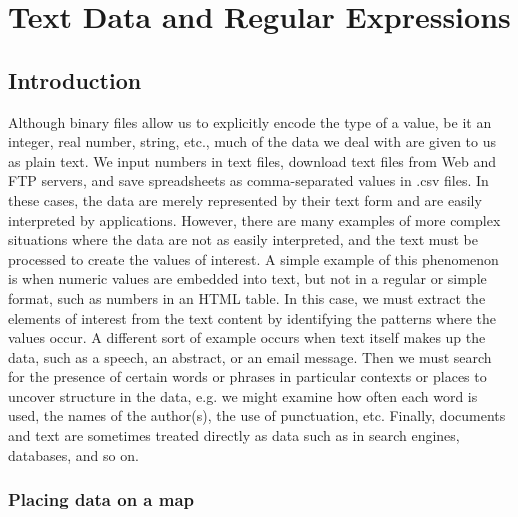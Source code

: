 \def\charClass#1{[[:#1:]]}
\def\code#1{\texttt{#1}}
\chapter{Text Data and Regular Expressions}
\section{Introduction}
Although binary files allow us to explicitly encode the type of a value, 
be it an integer, real number, string, etc., much of the
data we deal with are given to us as plain text.  We input numbers in text
files, download text files from Web and FTP servers, and save
spreadsheets as comma-separated values in .csv files. 
In these cases, the data are merely represented by their
text form and are easily interpreted by applications.  However, there
are many examples of more complex situations where the data are not as
easily interpreted, and  the text must be processed to
create the values of interest.  A simple example of this phenomenon is
when numeric values are embedded into text, but not in a regular or
simple format, such as numbers in an HTML table.  
In this case, we must extract the elements of interest from
the text content by identifying the patterns where the values occur.  
A different sort of example occurs when text itself makes up the data, 
such as a speech, an abstract, or an email message.  Then we must search
for the presence of certain words or phrases in particular contexts or places
to uncover structure in the data, e.g. we
might examine how often each word is used, the names of the author(s), 
the use of punctuation, etc.
Finally, documents and text are sometimes treated directly as
data such as in search engines, databases, and so on.   


\subsection{Placing data on a map}\label{ssec:map}

